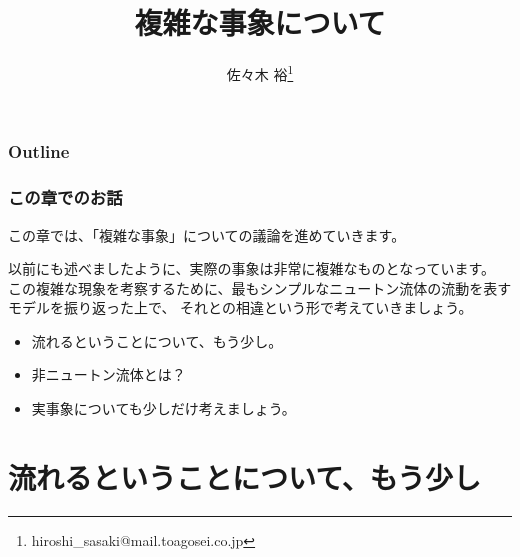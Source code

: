 \documentclass[12pt, dvipdfmx]{beamer}
\title
[複雑な事象について]
{複雑な事象について}
\author[東亞合成　佐々木]{佐々木 裕\thanks{hiroshi\_sasaki@mail.toagosei.co.jp}}
\institute[東亞合成]{東亞合成株式会社}
\date{}
\begin{document}
\maketitle

\begin{frame}
\frametitle{Outline}
\tableofcontents
\end{frame}

\begin{frame}
	\frametitle{この章でのお話}
		この章では、「複雑な事象」についての議論を進めていきます。

		以前にも述べましたように、実際の事象は非常に複雑なものとなっています。
		この複雑な現象を考察するために、最もシンプルなニュートン流体の流動を表すモデルを振り返った上で、
		それとの相違という形で考えていきましょう。

	\begin{itemize}
		\item 流れるということについて、もう少し。
		\item 非ニュートン流体とは？
		\item 実事象についても少しだけ考えましょう。
	\end{itemize}
\end{frame}

\section{流れるということについて、もう少し}
\end{document}
